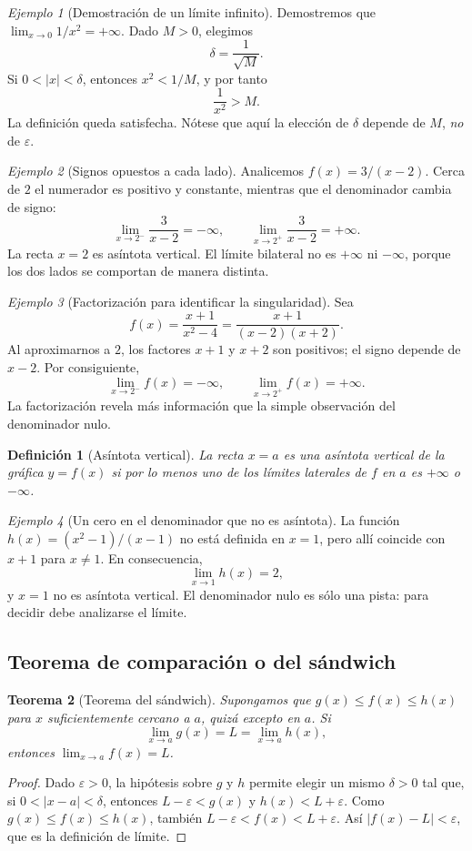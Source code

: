 \documentclass[12pt]{article}
\newtheorem{definicion}{Definición}[section]
\newtheorem{teorema}[definicion]{Teorema}
\theoremstyle{remark}
\newtheorem{ejemplo}{Ejemplo}
\begin{document}
\begin{ejemplo}[Demostración de un límite infinito]
Demostremos que $\lim_{x\to0}1/x^2=+\infty$. Dado $M>0$, elegimos
\[
 \delta=\frac1{\sqrt M}.
\]
Si $0<|x|<\delta$, entonces $x^2<1/M$, y por tanto
\[
 \frac1{x^2}>M.
\]
La definición queda satisfecha. Nótese que aquí la elección de $\delta$ depende de $M$, \emph{no} de $\varepsilon$.
\end{ejemplo}

\begin{ejemplo}[Signos opuestos a cada lado]
Analicemos $f(x)=3/(x-2)$. Cerca de $2$ el numerador es positivo y constante, mientras que el denominador cambia de signo:
\[
 \lim_{x\to2^-}\frac3{x-2}=-\infty,\qquad
 \lim_{x\to2^+}\frac3{x-2}=+\infty.
\]
La recta $x=2$ es asíntota vertical. El límite bilateral no es $+\infty$ ni $-\infty$, porque los dos lados se comportan de manera distinta.
\end{ejemplo}

\begin{ejemplo}[Factorización para identificar la singularidad]
Sea
\[
 f(x)=\frac{x+1}{x^2-4}=\frac{x+1}{(x-2)(x+2)}.
\]
Al aproximarnos a $2$, los factores $x+1$ y $x+2$ son positivos; el signo depende de $x-2$. Por consiguiente,
\[
 \lim_{x\to2^-}f(x)=-\infty,\qquad \lim_{x\to2^+}f(x)=+\infty.
\]
La factorización revela más información que la simple observación del denominador nulo.
\end{ejemplo}

\begin{definicion}[Asíntota vertical]
La recta $x=a$ es una asíntota vertical de la gráfica $y=f(x)$ si por lo menos uno de los límites laterales de $f$ en $a$ es $+\infty$ o $-\infty$.
\end{definicion}

\begin{ejemplo}[Un cero en el denominador que no es asíntota]
La función $h(x)=(x^2-1)/(x-1)$ no está definida en $x=1$, pero allí coincide con $x+1$ para $x\ne1$. En consecuencia,
\[
 \lim_{x\to1}h(x)=2,
\]
y $x=1$ no es asíntota vertical. El denominador nulo es sólo una pista: para decidir debe analizarse el límite.
\end{ejemplo}

\subsection*{Teorema de comparación o del sándwich}
\begin{teorema}[Teorema del sándwich]
Supongamos que $g(x)\le f(x)\le h(x)$ para $x$ suficientemente cercano a $a$, quizá excepto en $a$. Si
\[
 \lim_{x\to a}g(x)=L=\lim_{x\to a}h(x),
\]
entonces $\lim_{x\to a}f(x)=L$.
\end{teorema}
\begin{proof}
Dado $\varepsilon>0$, la hipótesis sobre $g$ y $h$ permite elegir un mismo $\delta>0$ tal que, si $0<|x-a|<\delta$, entonces $L-\varepsilon<g(x)$ y $h(x)<L+\varepsilon$. Como $g(x)\le f(x)\le h(x)$, también $L-\varepsilon<f(x)<L+\varepsilon$. Así $|f(x)-L|<\varepsilon$, que es la definición de límite.
\end{proof}
\end{document}

